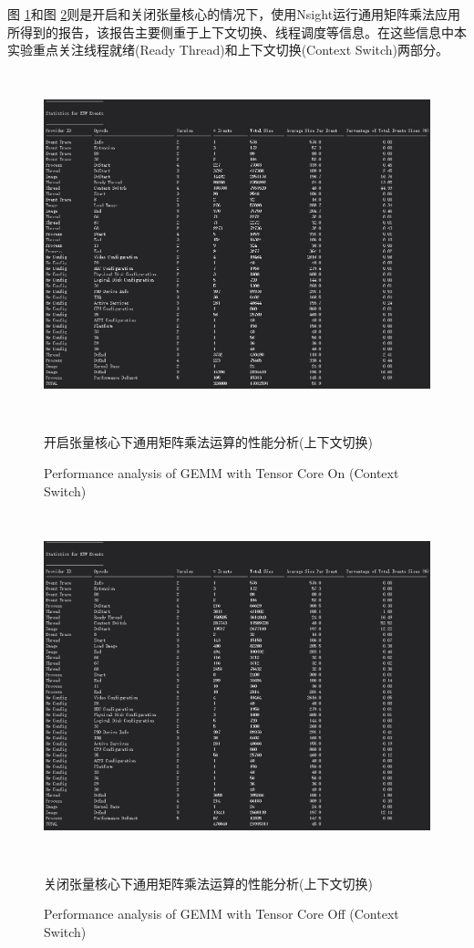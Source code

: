 \par 图 \ref{Fig.GEMMSIGHTTF}和图 \ref{Fig.GEMMSIGHTNOTF}则是开启和关闭张量核心的情况下，使用Nsight运行通用矩阵乘法应用所得到的报告，该报告主要侧重于上下文切换、线程调度等信息。在这些信息中本实验重点关注线程就绪(Ready Thread)和上下文切换(Context Switch)两部分。

\begin{figure}
	\centering
	\includegraphics[width=15cm,height=10cm]{figures/GEMMSIGHTTF.jpg}
	\renewcommand{\thefigure}{\arabic{section}-\arabic{figure} }
	\renewcommand{\figurename}{图}
	\caption{开启张量核心下通用矩阵乘法运算的性能分析(上下文切换)}
	\addtocounter{figure}{-1}
	\renewcommand{\thefigure}{\arabic{section}-\arabic{figure} }
	\renewcommand{\figurename}{Figure}
	\caption{Performance analysis of GEMM with Tensor Core On (Context Switch)}
	\label{Fig.GEMMSIGHTTF}
\end{figure}
\begin{figure}
	\centering
	\includegraphics[width=15cm,height=10cm]{figures/GEMMSIGHTNOTF.jpg}
	\renewcommand{\thefigure}{\arabic{section}-\arabic{figure} }
	\renewcommand{\figurename}{图}
	\caption{关闭张量核心下通用矩阵乘法运算的性能分析(上下文切换)}
	\addtocounter{figure}{-1}
	\renewcommand{\thefigure}{\arabic{section}-\arabic{figure} }
	\renewcommand{\figurename}{Figure}
	\caption{Performance analysis of GEMM with Tensor Core Off (Context Switch)}
	\label{Fig.GEMMSIGHTNOTF}
\end{figure}
